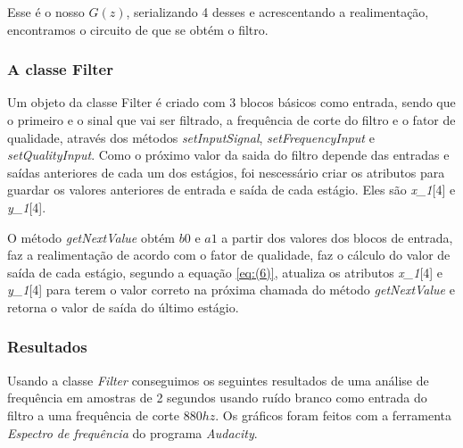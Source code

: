 \documentclass{article}
\begin{document}
Esse é o nosso $G(z)$, serializando 4 desses e acrescentando a realimentação, encontramos o circuito de que se obtém o filtro.


\subsubsection{A classe Filter}
Um objeto da classe Filter é criado com 
3 blocos básicos como entrada, sendo que o primeiro e o sinal que vai ser filtrado, a frequência de corte do filtro e o fator de qualidade, através dos
métodos \emph{setInputSignal}, \emph{setFrequencyInput} e \emph{setQualityInput}.
Como o próximo valor da saida do filtro depende das entradas e saídas anteriores de cada um dos estágios, foi nescessário criar os atributos
 para guardar os valores anteriores de entrada e saída de cada estágio. Eles são \emph{x\_1}[4] e \emph{y\_1}[4]. 


O método \emph{getNextValue} obtém $b0$ e $a1$ a partir dos valores dos blocos de entrada, faz a realimentação de acordo com o fator de qualidade, 
 faz o cálculo do valor de saída de cada estágio, segundo a equação \ref{eq:(6)}, atualiza os atributos \emph{x\_1}[4] e \emph{y\_1}[4] para terem o valor correto
 na próxima chamada do método \emph{getNextValue} e retorna o valor de saída do último estágio.

\subsubsection{Resultados}


Usando a classe \emph{Filter} conseguimos os seguintes resultados de uma análise de frequência em amostras de 2 segundos usando ruído branco como entrada do filtro
 a uma frequência  de corte $880 hz$. Os gráficos foram feitos com a ferramenta \emph{Espectro de frequência} do programa \emph{Audacity}.
\end{document}
